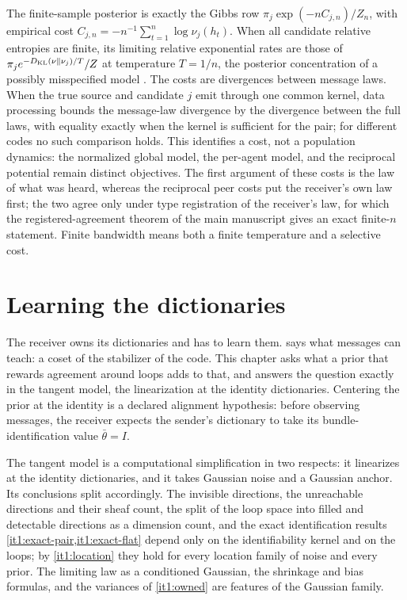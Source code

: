 \documentclass[11pt,letterpaper]{report}
\begin{document}
The finite-sample posterior is exactly the Gibbs row $\pi_j\exp(-nC_{j,n})/Z_n$, with empirical cost $C_{j,n}=-n^{-1}\sum_{t=1}^n\log\nu_j(h_t)$. When all candidate relative entropies are finite, its limiting relative exponential rates are those of $\pi_je^{-D_{\mathrm{KL}}(\nu\Vert\nu_j)/T}/Z$ at temperature $T=1/n$, the posterior concentration of a possibly misspecified model \citep{Berk1966}. The costs are divergences between message laws. When the true source and candidate $j$ emit through one common kernel, data processing bounds the message-law divergence by the divergence between the full laws, with equality exactly when the kernel is sufficient for the pair; for different codes no such comparison holds. This identifies a cost, not a population dynamics: the normalized global model, the per-agent model, and the reciprocal potential remain distinct objectives. The first argument of these costs is the law of what was heard, whereas the reciprocal peer costs put the receiver's own law first; the two agree only under type registration of the receiver's law, for which the registered-agreement theorem of the main manuscript gives an exact finite-$n$ statement. Finite bandwidth means both a finite temperature and a selective cost.

\chapter{Learning the dictionaries}
\label{it1:ch-learning}

The receiver owns its dictionaries and has to learn them.  says what messages can teach: a coset of the stabilizer of the code. This chapter asks what a prior that rewards agreement around loops adds to that, and answers the question exactly in the tangent model, the linearization at the identity dictionaries. Centering the prior at the identity is a declared alignment hypothesis: before observing messages, the receiver expects the sender's dictionary to take its bundle-identification value $\bar\theta=I$.

The tangent model is a computational simplification in two respects: it linearizes at the identity dictionaries, and it takes Gaussian noise and a Gaussian anchor. Its conclusions split accordingly. The invisible directions, the unreachable directions and their sheaf count, the split of the loop space into filled and detectable directions as a dimension count, and the exact identification results \cref{it1:exact-pair,it1:exact-flat} depend only on the identifiability kernel and on the loops; by \cref{it1:location} they hold for every location family of noise and every prior. The limiting law as a conditioned Gaussian, the shrinkage and bias formulas, and the variances of \cref{it1:owned} are features of the Gaussian family.
\end{document}
